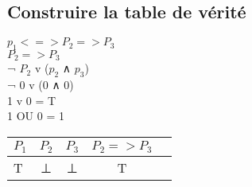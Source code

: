 \subsection{Construire la table de vérité}
\vspace{5mm} %
$p_1 <=> P_2 => P_3$ \\

$P_2 => P_3$ \\
¬ $P_2$ v ($p_2$ ∧ $p_3$) \\
¬ 0 v (0 ∧ 0) \\
1 v 0 = T \\
1 OU 0 = 1 \\

\begin{tabular}{|l|c|c|c|c|}
  \hline
  $P_1$ & $P_2$ & $P_3$ & $P_2 => P_3$ \\
  \hline
  T & ⊥ & ⊥ & T \\
  \hline
\end{tabular}
